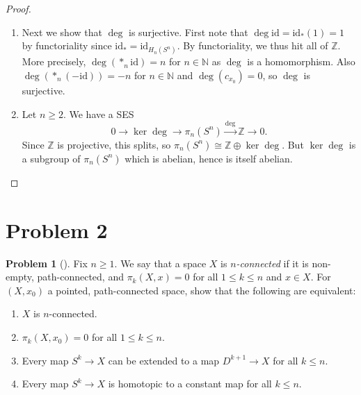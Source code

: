 \documentclass[reqno]{amsart}
\theoremstyle{definition}
\newtheorem{problem}[theorem]{Problem}
\theoremstyle{remark}
\newcommand{\id}{{\mathrm{id}}}
\begin{document}
\begin{proof}
\begin{enumerate}
    \item 
        Next we show that $\deg$ is surjective. 
        First note that
        $\deg \id = \id_* (1) = 1$ by functoriality since
        $\id_* = \id_{H_n(S^{n})}$.
        By functoriality, we thus hit
        all of $\mathbb{Z}$. More precisely,
        $\deg \left( \ast_{n} \id \right) = n$ for
        $n \in \mathbb{N} $ as
        $\deg$ is a homomorphism.
        Also $\deg \left( \ast_{n} (-\id) \right) 
        = -n$ for $n \in \mathbb{N} $ and
        $\deg (c_{x_0}) = 0$, so
        $\deg$ is surjective.
    \item Let $n\ge 2$. We have a SES
        \[
        0 \to \ker \deg \to 
        \pi_n\left( S^{n} \right) \stackrel{\deg}{\to }
        \mathbb{Z} \to 0.
        \] 
        Since $\mathbb{Z}$ is projective, 
        this splits, so
        $\pi_n\left( S^{n} \right) 
        \cong \mathbb{Z} \oplus \ker \deg$.
        But $\ker \deg$ is a subgroup of
        $\pi_n\left( S^{n} \right) $ which is abelian, hence
        is itself abelian.







        \end{enumerate}

    \end{proof}

    \section{Problem 2}

    \begin{problem}[]
        Fix $n\ge 1$. We say that a space $X$ is
        \textit{$n$-connected} if it is non-empty, path-connected,
        and $\pi_k (X, x) = 0$ for all $1 \le k \le n$ and
        $x \in X$.
        For $\left( X, x_0 \right) $ a pointed, path-connected space,
        show that the following are equivalent:
        \begin{enumerate}
            \item $X$ is $n$-connected.
            \item $\pi_k\left( X,x_0 \right) = 0$ for all
                $1 \le k \le n$.
            \item Every map
                $S^{k} \to X$ can be extended to a map
                $D^{k+1} \to X$ for all $k \le n$.
            \item Every map
                $S^{k} \to X$ is homotopic to a constant
                map for all
                $k \le n$.
        \end{enumerate}
    \end{problem}
\end{document}
